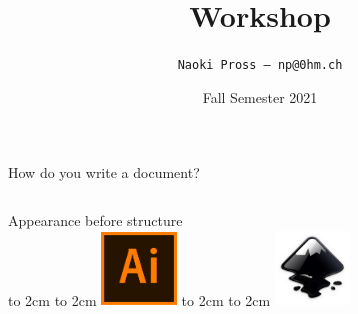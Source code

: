 \documentclass[xetex, onlymath, handout]{beamer}
\title{\textrm{\LaTeXe} Workshop}
\author[NaoPross]{\texttt{Naoki Pross --- np@0hm.ch}}
\date{Fall Semester 2021}
\institute[OST]{OST FHO Campus Rapperswil}
\begin{document}
\frame{
  \maketitle
}

\begin{frame}{How do you write a document?}
\begin{columns}
  \begin{column}{.3\linewidth}
    \begin{center}
      {\large Appearance before structure} \\
      \vspace{1cm}
      \vbox to 2cm {\vfil\hfil \hbox to 2cm {
          \includegraphics[width=2cm]{figs/illustrator-logo}
      } \hfil\vfil }
      \vspace{1cm}
      \vbox to 2cm {\vfil\hfil \hbox to 2cm {
        \includegraphics[width=2cm]{figs/inkscape-logo}
      } \hfil\vfil }
    \end{center}
  \end{column}
  \begin{column}{.3\linewidth}
  \end{column}

\end{columns}
\end{frame}
\end{document}
